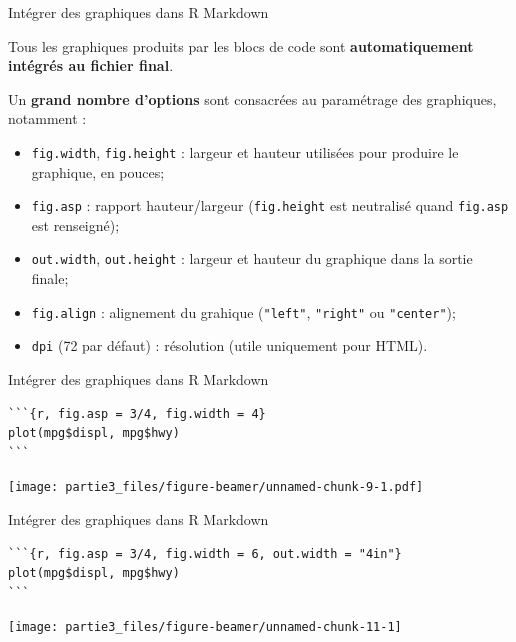 \documentclass[12pt,ignorenonframetext,]{beamer}
\providecommand{\tightlist}{%
  \setlength{\itemsep}{0pt}\setlength{\parskip}{0pt}}
\begin{document}
\begin{frame}[fragile]{Intégrer des graphiques dans R Markdown}

Tous les graphiques produits par les blocs de code sont
\textbf{automatiquement intégrés au fichier final}.

\pause Un \textbf{grand nombre d'options} sont consacrées au paramétrage
des graphiques, notamment :

\begin{itemize}
\tightlist
\item
  \texttt{fig.width}, \texttt{fig.height} : largeur et hauteur utilisées
  pour produire le graphique, en pouces;
\item
  \texttt{fig.asp} : rapport hauteur/largeur (\texttt{fig.height} est
  neutralisé quand \texttt{fig.asp} est renseigné);
\item
  \texttt{out.width}, \texttt{out.height} : largeur et hauteur du
  graphique dans la sortie finale;
\item
  \texttt{fig.align} : alignement du grahique (\texttt{"left"},
  \texttt{"right"} ou \texttt{"center"});
\item
  \texttt{dpi} (72 par défaut) : résolution (utile uniquement pour
  HTML).
\end{itemize}

\end{frame}

\begin{frame}[fragile]{Intégrer des graphiques dans R Markdown}

\footnotesize \center

\begin{verbatim}
```{r, fig.asp = 3/4, fig.width = 4}
plot(mpg$displ, mpg$hwy)
```
\end{verbatim}

\texttt{[image: partie3\_files/figure-beamer/unnamed-chunk-9-1.pdf]}

\end{frame}

\begin{frame}[fragile]{Intégrer des graphiques dans R Markdown}

\footnotesize \center

\begin{verbatim}
```{r, fig.asp = 3/4, fig.width = 6, out.width = "4in"}
plot(mpg$displ, mpg$hwy)
```
\end{verbatim}

\texttt{[image: partie3\_files/figure-beamer/unnamed-chunk-11-1]}

\end{frame}
\end{document}
